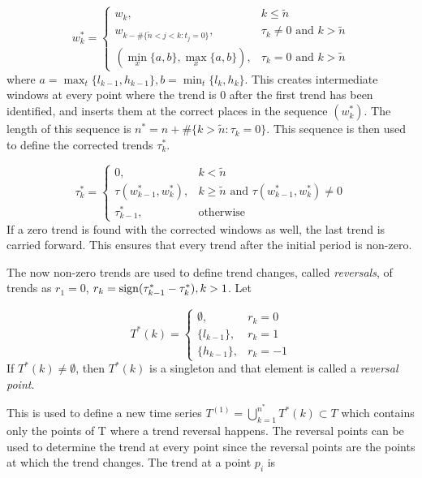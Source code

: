 \documentclass[../trend-calculus.tex]{subfiles}
\begin{document}
  \begin{equation*}
    w_k^* = \begin{cases}
      w_k, & k \le \tilde n \\
      w_{k - \#\{\tilde n < j < k : t_j = 0\}}, & \tau_k \ne 0 \text{ and } k > \tilde n \\
      (\min_x\{a,b\}, \max_x\{a,b\}), & \tau_k = 0 \text{ and } k > \tilde n 
    \end{cases}
  \end{equation*}
  where $a = \max_t\{l_{k-1}, h_{k-1}\}, b = \min_t\{l_k, h_k\}$.
  This creates intermediate windows at every point where 
  the trend is 0 after the first trend has been identified, 
  and inserts them at the correct places in the sequence $(w_k^*)$.
  The length of this sequence is $n^* = n + \#\{k > \tilde n : \tau_k = 0\}$.
  This sequence is then used to define the corrected trends $\tau_k^*$.

  \begin{equation*}
    \tau_k^* = \begin{cases}
      0, & k < \tilde n \\
      \tau(w_{k-1}^*, w_k^*), & k \ge \tilde n \text{ and } \tau(w_{k-1}^*, w_k^*) \ne 0 \\
      \tau_{k-1}^*, & \text{otherwise}
    \end{cases}
  \end{equation*}
  If a zero trend is found with the corrected windows as well, the last trend is carried forward.
  This ensures that every trend after the initial period is non-zero.

  The now non-zero trends are used to define trend changes, called \textit{reversals}, 
  of trends as $r_1 = 0$, $r_k = {\mathop{\rm sign}}(\tau_{k-1}^* - \tau_k^*), k > 1$.
  Let

  \begin{equation*}
    T^*(k) = \begin{cases}
      \emptyset, & r_k = 0 \\
      \{ l_{k-1} \}, & r_k = 1 \\
      \{ h_{k-1} \}, & r_k = -1 
    \end{cases}
  \end{equation*}
  If $T^*(k) \ne \emptyset$, then $T^*(k)$ is a singleton and 
  that element is called a \textit{reversal point}.

  This is used to define a new time series 
  $T^{(1)} = \bigcup_{k=1}^{n^*} T^*(k) \subset T$
  which contains only the points of T where a trend reversal happens.
  The reversal points can be used to determine the trend at 
  every point since the reversal points are the points at which the trend changes.
  The trend at a point $p_i$ is 
  
\end{document}
